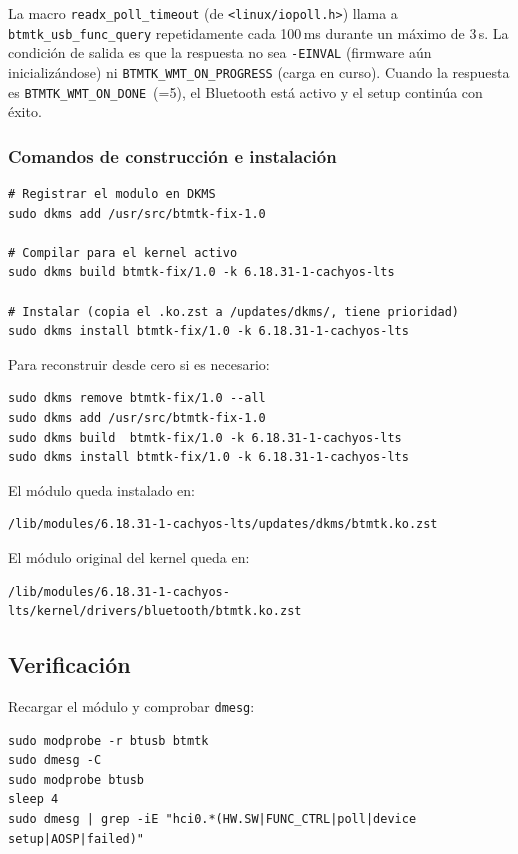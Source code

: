 \documentclass[12pt,a4paper]{article}
\begin{document}
La macro \texttt{readx\_poll\_timeout} (de \texttt{<linux/iopoll.h>}) llama
a \texttt{btmtk\_usb\_func\_query} repetidamente cada 100\,ms durante un
máximo de 3\,s. La condición de salida es que la respuesta no sea
\texttt{-EINVAL} (firmware aún inicializándose) ni
\texttt{BTMTK\_WMT\_ON\_PROGRESS} (carga en curso). Cuando la respuesta es
\texttt{BTMTK\_WMT\_ON\_DONE}~(=5), el Bluetooth está activo y el setup
continúa con éxito.

\subsubsection{Comandos de construcción e instalación}

\begin{lstlisting}[style=bash]
# Registrar el modulo en DKMS
sudo dkms add /usr/src/btmtk-fix-1.0

# Compilar para el kernel activo
sudo dkms build btmtk-fix/1.0 -k 6.18.31-1-cachyos-lts

# Instalar (copia el .ko.zst a /updates/dkms/, tiene prioridad)
sudo dkms install btmtk-fix/1.0 -k 6.18.31-1-cachyos-lts
\end{lstlisting}

Para reconstruir desde cero si es necesario:

\begin{lstlisting}[style=bash]
sudo dkms remove btmtk-fix/1.0 --all
sudo dkms add /usr/src/btmtk-fix-1.0
sudo dkms build  btmtk-fix/1.0 -k 6.18.31-1-cachyos-lts
sudo dkms install btmtk-fix/1.0 -k 6.18.31-1-cachyos-lts
\end{lstlisting}

El módulo queda instalado en:
\begin{lstlisting}[style=bash]
/lib/modules/6.18.31-1-cachyos-lts/updates/dkms/btmtk.ko.zst
\end{lstlisting}

El módulo original del kernel queda en:
\begin{lstlisting}[style=bash]
/lib/modules/6.18.31-1-cachyos-lts/kernel/drivers/bluetooth/btmtk.ko.zst
\end{lstlisting}

\subsection{Verificación}

Recargar el módulo y comprobar \texttt{dmesg}:

\begin{lstlisting}[style=bash]
sudo modprobe -r btusb btmtk
sudo dmesg -C
sudo modprobe btusb
sleep 4
sudo dmesg | grep -iE "hci0.*(HW.SW|FUNC_CTRL|poll|device setup|AOSP|failed)"
\end{lstlisting}
\end{document}
